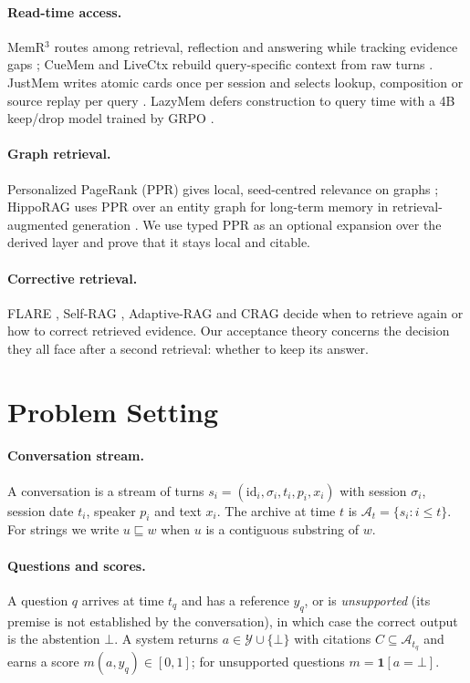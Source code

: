 \documentclass[10pt]{article}
\theoremstyle{plain}
\theoremstyle{definition}
\theoremstyle{remark}
\newcommand{\sub}{\sqsubseteq}
\newcommand{\A}{\mathcal{A}}
\begin{document}
\paragraph{Read-time access.}
MemR$^3$ routes among retrieval, reflection and answering while tracking evidence
gaps \citep{du2026memr3}; CueMem and LiveCtx rebuild query-specific context from
raw turns \citep{wang2026cuemem,liu2026livectx}. JustMem writes atomic cards once
per session and selects lookup, composition or source replay per query
\citep{chen2026justmem}. LazyMem defers construction to query time with a 4B
keep/drop model trained by GRPO \citep{yu2026lazymem}.

\paragraph{Graph retrieval.}
Personalized PageRank (PPR) gives local, seed-centred relevance on graphs
\citep{andersen2006local}; HippoRAG uses PPR over an entity graph for long-term
memory in retrieval-augmented generation \citep{gutierrez2024hipporag}. We use
typed PPR as an optional expansion over the derived layer and prove that it stays
local and citable.

\paragraph{Corrective retrieval.}
FLARE \citep{jiang2023active}, Self-RAG \citep{asai2023selfrag}, Adaptive-RAG
\citep{jeong2024adaptive} and CRAG \citep{yan2024crag} decide when to retrieve
again or how to correct retrieved evidence. Our acceptance theory concerns the
decision they all face after a second retrieval: whether to keep its answer.

\section{Problem Setting}
\label{sec:setting}

\paragraph{Conversation stream.}
A conversation is a stream of turns $s_i=(\mathrm{id}_i,\sigma_i,t_i,p_i,x_i)$
with session $\sigma_i$, session date $t_i$, speaker $p_i$ and text $x_i$. The
archive at time $t$ is $\A_t=\{s_i : i\le t\}$. For strings we write $u\sub w$
when $u$ is a contiguous substring of $w$.

\paragraph{Questions and scores.}
A question $q$ arrives at time $t_q$ and has a reference $y_q$, or is
\emph{unsupported} (its premise is not established by the conversation), in
which case the correct output is the abstention $\bot$. A system returns
$a\in\mathcal{Y}\cup\{\bot\}$ with citations $C\subseteq\A_{t_q}$ and earns a score
$m(a,y_q)\in[0,1]$; for unsupported questions $m=\mathbf{1}[a=\bot]$.
\end{document}
